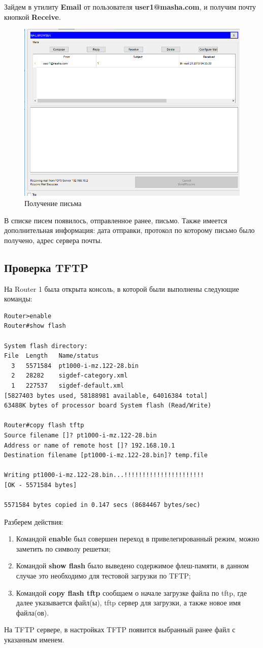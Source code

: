 \documentclass[14pt,a4paper,report]{report}
\begin{document}
Зайдем в утилиту \textbf{Email} от пользователя \textbf{user1@masha.com}, и получим почту кнопкой \textbf{Receive}.

\begin{figure}[h]
  \centering
  \includegraphics[width=.8\textwidth]{img/9}
  \caption{Получение письма}
\end{figure}
В списке писем появилось, отправленное ранее, письмо. Также имеется дополнительная информация: дата отправки, протокол по которому письмо было получено, адрес сервера почты. 

\subsection{Проверка TFTP}
На Router 1 была открыта консоль, в которой были выполнены следующие команды:
\begin{lstlisting}[language={}]
Router>enable
Router#show flash

System flash directory:
File  Length   Name/status
  3   5571584  pt1000-i-mz.122-28.bin
  2   28282    sigdef-category.xml
  1   227537   sigdef-default.xml
[5827403 bytes used, 58188981 available, 64016384 total]
63488K bytes of processor board System flash (Read/Write)

Router#copy flash tftp
Source filename []? pt1000-i-mz.122-28.bin
Address or name of remote host []? 192.168.10.1
Destination filename [pt1000-i-mz.122-28.bin]? temp.file

Writing pt1000-i-mz.122-28.bin...!!!!!!!!!!!!!!!!!!!!!!
[OK - 5571584 bytes]

5571584 bytes copied in 0.147 secs (8684467 bytes/sec)
\end{lstlisting}
Разберем действия:
\begin{enumerate}
\item Командой \textbf{enable} был совершен переход в привелегированный режим, можно заметить по символу решетки;
\item Командой \textbf{show flash} было выведено содержимое флеш-памяти, в данном случае это необходимо для тестовой загрузки по TFTP;
\item Командой \textbf{copy flash tftp} сообщаем о начале загрузке файла по tftp, где далее указывается файл(ы), tftp сервер для загрузки, а также новое имя файла(ов). 
\end{enumerate}
На TFTP сервере, в настройках TFTP появится выбранный ранее файл с указанным именем.
\end{document}
